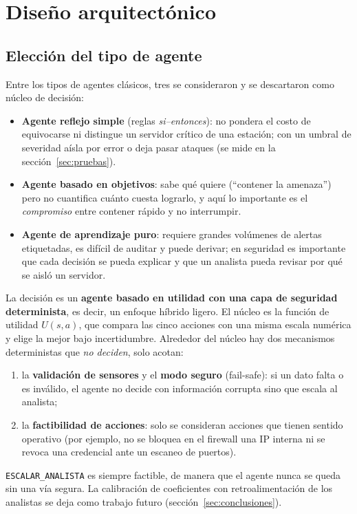 \documentclass[11pt,a4paper]{article}
\begin{document}
\section{Diseño arquitectónico}\label{sec:arq}

\subsection{Elección del tipo de agente}

Entre los tipos de agentes clásicos, tres se consideraron y se descartaron como núcleo de decisión:
\begin{itemize}
\item \textbf{Agente reflejo simple} (reglas \emph{si--entonces}): no pondera el costo de equivocarse ni distingue un servidor crítico de una estación; con un umbral de severidad aísla por error o deja pasar ataques (se mide en la sección~\ref{sec:pruebas}).
\item \textbf{Agente basado en objetivos}: sabe qué quiere (``contener la amenaza'') pero no cuantifica cuánto cuesta lograrlo, y aquí lo importante es el \emph{compromiso} entre contener rápido y no interrumpir.
\item \textbf{Agente de aprendizaje puro}: requiere grandes volúmenes de alertas etiquetadas, es difícil de auditar y puede derivar; en seguridad es importante que cada decisión se pueda explicar y que un analista pueda revisar por qué se aisló un servidor.
\end{itemize}

La decisión es un \textbf{agente basado en utilidad con una capa de seguridad determinista}, es decir, un enfoque híbrido ligero. El núcleo es la función de utilidad $U(s,a)$, que compara las cinco acciones con una misma escala numérica y elige la mejor bajo incertidumbre. Alrededor del núcleo hay dos mecanismos deterministas que \emph{no deciden}, solo acotan:
\begin{enumerate}
\item la \textbf{validación de sensores} y el \textbf{modo seguro} (fail-safe): si un dato falta o es inválido, el agente no decide con información corrupta sino que escala al analista;
\item la \textbf{factibilidad de acciones}: solo se consideran acciones que tienen sentido operativo (por ejemplo, no se bloquea en el firewall una IP interna ni se revoca una credencial ante un escaneo de puertos).
\end{enumerate}
\texttt{ESCALAR\_ANALISTA} es siempre factible, de manera que el agente nunca se queda sin una vía segura. La calibración de coeficientes con retroalimentación de los analistas se deja como trabajo futuro (sección~\ref{sec:conclusiones}).
\end{document}
